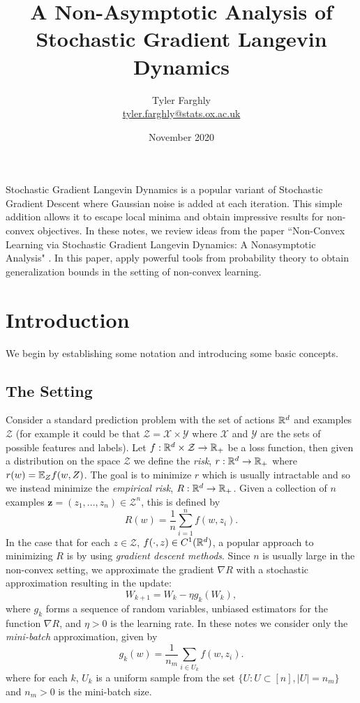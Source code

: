 \documentclass{article}
\title{A Non-Asymptotic Analysis of Stochastic Gradient Langevin Dynamics}
\author{Tyler Farghly\\
\href{mailto:tyler.farghly@stats.ox.ac.uk}{tyler.farghly@stats.ox.ac.uk}}
\date{November 2020}
\newcommand{\Bbf}[1]{\mathbf{#1}}
\newcommand{\Bcal}[1]{\mathcal{#1}}
\begin{document}
\maketitle

Stochastic Gradient Langevin Dynamics is a popular variant of Stochastic Gradient Descent where Gaussian noise is added at each iteration. This simple addition allows it to escape local minima and obtain impressive results for non-convex objectives. In these notes, we review ideas from the paper ``Non-Convex Learning via Stochastic Gradient Langevin Dynamics: A Nonasymptotic Analysis" \cite{Raginsky2017Non-ConvexAnalysis}. In this paper, \citeauthor{Raginsky2017Non-ConvexAnalysis} apply powerful tools from probability theory to obtain generalization bounds in the setting of non-convex learning.

\section{Introduction}
We begin by establishing some notation and introducing some basic concepts.

\subsection{The Setting}
Consider a standard prediction problem with the set of actions \(\Bbb{R}^d\) and examples \(\Bcal{Z}\) (for example it could be that \(\Bcal{Z} = \Bcal{X} \times \Bcal{Y}\) where \(\Bcal{X}\) and \(\Bcal{Y}\) are the sets of possible features and labels). Let \(f: \Bbb{R}^d \times \Bcal{Z} \to \Bbb{R}_+\) be a loss function, then given a distribution on the space \(\Bcal{Z}\) we define the \textit{risk}, \(r: \Bbb{R}^d \to \Bbb{R}_+\) where \(r(w) = \Bbb{E}_Z f(w, Z)\). The goal is to minimize \(r\) which is usually intractable and so we instead minimize the \textit{empirical risk}, \(R: \Bbb{R}^d \to \Bbb{R}_+\). Given a collection of \(n\) examples \(\Bbf{z} = (z_1, ..., z_n) \in \Bcal{Z}^n\), this is defined by
\begin{equation*}
    R(w) = \frac{1}{n} \sum_{i=1}^n f(w, z_i).
\end{equation*}
In the case that for each \(z \in \Bcal{Z}\), \(f(\cdot, z) \in C^1(\Bbb{R}^d)\), a popular approach to minimizing \(R\) is by using \textit{gradient descent methods}. Since \(n\) is usually large in the non-convex setting, we approximate the gradient \(\nabla R\) with a stochastic approximation resulting in the update:
\begin{equation*}
    W_{k+1} = W_k - \eta g_k(W_k),
\end{equation*}
where \(g_k\) forms a sequence of random variables, unbiased estimators for the function \(\nabla R\), and \(\eta > 0\) is the learning rate. In these notes we consider only the \textit{mini-batch} approximation, given by
\begin{equation*}
    g_k(w) = \frac{1}{n_m} \sum_{i \in U_k} f(w, z_i).
\end{equation*}
where for each \(k\), \(U_k\) is a uniform sample from the set \(\{U: U \subset [n], |U| = n_m\}\) and \(n_m > 0\) is the mini-batch size.
\end{document}
